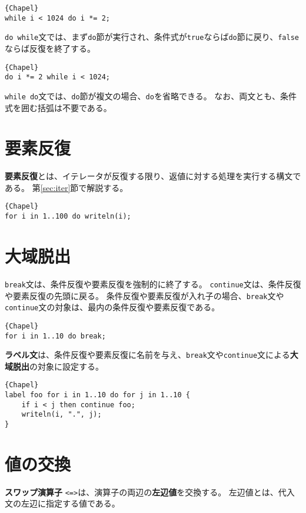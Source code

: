\documentclass[10pt,a4paper]{book}
\begin{document}
\begin{Verbatim}{Chapel}
while i < 1024 do i *= 2;
\end{Verbatim}

\verb#do while#文では、まず\verb#do#節が実行され、条件式が\verb#true#ならば\verb#do#節に戻り、\verb#false#ならば反復を終了する。

\begin{Verbatim}{Chapel}
do i *= 2 while i < 1024;
\end{Verbatim}

\verb#while do#文では、\verb#do#節が複文の場合、\verb#do#を省略できる。
なお、両文とも、条件式を囲む括弧は不要である。

\section{要素反復}

\textbf{要素反復}とは、イテレータが反復する限り、返値に対する処理を実行する構文である。
第\ref{sec:iter}節で解説する。

\begin{Verbatim}{Chapel}
for i in 1..100 do writeln(i);
\end{Verbatim}

\section{大域脱出}

\verb#break#文は、条件反復や要素反復を強制的に終了する。
\verb#continue#文は、条件反復や要素反復の先頭に戻る。
条件反復や要素反復が入れ子の場合、\verb#break#文や\verb#continue#文の対象は、最内の条件反復や要素反復である。

\begin{Verbatim}{Chapel}
for i in 1..10 do break;
\end{Verbatim}

\textbf{ラベル文}は、条件反復や要素反復に名前を与え、\verb#break#文や\verb#continue#文による\textbf{大域脱出}の対象に設定する。

\begin{Verbatim}{Chapel}
label foo for i in 1..10 do for j in 1..10 {
	if i < j then continue foo;
	writeln(i, ".", j);
}
\end{Verbatim}

\section{値の交換}

\textbf{スワップ演算子} \verb#<=>#は、演算子の両辺の\textbf{左辺値}を交換する。
左辺値とは、代入文の左辺に指定する値である。
\end{document}
